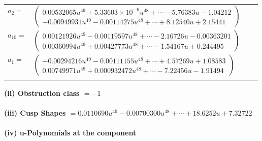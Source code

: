 \documentclass[1p]{elsarticle_modified}
\theoremstyle{definition}
\begin{document}
\begin{tabular}{m{7pt} m{180pt} m{7pt} m{180pt} }
\flushright $a_{2}=$&$\begin{pmatrix}0.00532065 u^{49}+5.33603\times10^{-6} u^{48}+\cdots-5.76383 u-1.04212\\-0.00949931 u^{49}-0.00114275 u^{48}+\cdots+8.12540 u+2.15441\end{pmatrix}$ \\
\flushright $a_{10}=$&$\begin{pmatrix}0.00121926 u^{49}-0.00119597 u^{48}+\cdots-2.16726 u-0.00363201\\0.00360994 u^{49}+0.00427773 u^{48}+\cdots-1.54167 u+0.244495\end{pmatrix}$ \\
\flushright $a_{1}=$&$\begin{pmatrix}-0.00294216 u^{49}-0.00111155 u^{48}+\cdots+4.57269 u+1.08583\\0.00749971 u^{49}+0.000932472 u^{48}+\cdots-7.22456 u-1.91494\end{pmatrix}$\\&\end{tabular}
\flushleft \textbf{(ii) Obstruction class $= -1$}\\~\\
\flushleft \textbf{(iii) Cusp Shapes $= 0.0110690 u^{49}-0.00700300 u^{48}+\cdots+18.6252 u+7.32722$}\\~\\
\newpage\renewcommand{\arraystretch}{1}
\flushleft \textbf{(iv) u-Polynomials at the component}\newline \\
\end{document}
